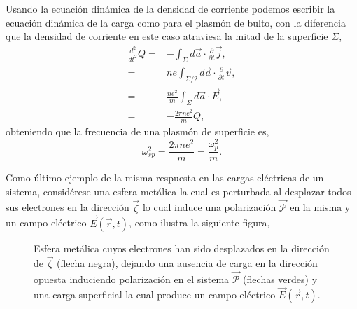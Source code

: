 \documentclass[12pt]{article}
\begin{document}
Usando la ecuación dinámica de la densidad de corriente podemos
escribir la ecuación dinámica de la carga como para el plasmón de
bulto, con la diferencia que la densidad de corriente en este caso
atraviesa la mitad de la superficie $\Sigma $,
\begin{equation}
  \begin{split}
    \frac{d^{2}}{dt^{2}}Q = & -\int_{\Sigma}d\vec{a}\cdot\frac{\partial}{\partial t}\vec{j},\\
    = & ne \int_{\Sigma/2}d\vec{a}\cdot\frac{\partial}{\partial t}\vec{v},\\
    = & \frac{ne^{2}}{m}\int_{\Sigma}d\vec{a}\cdot \vec{E}, \\
    = & -\frac{2\pi ne^{2}}{m}Q,
  \end{split}
\end{equation}
obteniendo que la frecuencia de una plasmón de superficie es,
\begin{equation}
  \omega_{sp}^{2}=\frac{2\pi ne^{2}}{m} = \frac{\omega_{p}^{2}}{m}.
  \label{surfaceplasmonfrecuency}
\end{equation}

Como último ejemplo de la misma respuesta en las cargas eléctricas de
un sistema, considérese una esfera metálica la cual es perturbada al
desplazar todos sus electrones en la dirección $\vec{\zeta}$ lo cual
induce una polarización $\vec{\mathcal{P}}$ en la misma y un campo
eléctrico $\vec{E}(\vec{r},t)$, como ilustra la siguiente figura,
\begin{figure}
  \centering
  

    \caption{Esfera metálica cuyos electrones han sido desplazados en la
  dirección de $\vec{\zeta}$ (flecha negra), dejando una ausencia de
  carga en la dirección opuesta induciendo polarización en el sistema
  $\vec{\mathcal{P}}$ (flechas verdes) y una carga superficial la cual
  produce un campo eléctrico $\vec{E}(\vec{r},t)$.}
\label{Polariton}

\end{figure}
\end{document}
